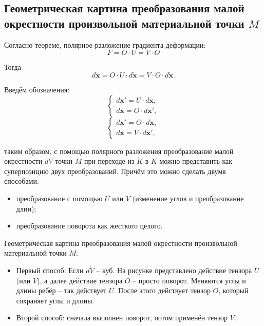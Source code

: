 \subsection{Геометрическая картина преобразования малой окрестности произвольной материальной
точки $M$}


Согласно теореме, полярное разложение градиента деформации: 
\[
  F = O \cdot U = V \cdot O
\]

Тогда
\[
  d\mathbf{x} = O \cdot U \cdot d\mathring{\mathbf{x}} = V \cdot O \cdot d \mathring{\mathbf{x}}.
\]

Введём обозначения:
\[
  \begin{cases}
    d\mathbf{x}' = U \cdot d\mathring{\mathbf{x}}, \\
    d\mathbf{x} = O \cdot d\mathbf{x}',
  \end{cases}
\]
\[
  \begin{cases}
    d\mathbf{x}' = O \cdot d\mathring{\mathbf{x}}, \\
    d\mathbf{x} = V \cdot d\mathbf{x}',
  \end{cases}
  
\]

таким образом, с помощью полярного разложения преобразование малой окрестности
$dV$ точки $M$ при переходе из $\mathring{K}$ в $K$ можно представить как суперпозицию
двух преобразований. Причём это можно сделать двумя способами:
\begin{itemize}
  \item преобразование с помощью $U$ или $V$ (изменение углов и преобразование длин);
  \item преобразование поворота как жесткого целого.
\end{itemize}

\begin{example}
  Геометрическая картина преобразования малой окрестности произвольной материальной
точки $M$:
  \begin{itemize}
    \item Первый способ:
      Если $d\mathring{V}$ -- куб. На рисунке представлено действие тензора $U$ (или $V$),
      а далее действие тензора $O$ -- просто поворот.
      Меняются углы и длины ребёр -- так действует $U$. После этого действует тензор $O$, который 
      сохраняет углы и длины.

    \item Второй способ:
      сначала выполнен поворот, потом применён тензор $V$.
  \end{itemize}
\end{example}



